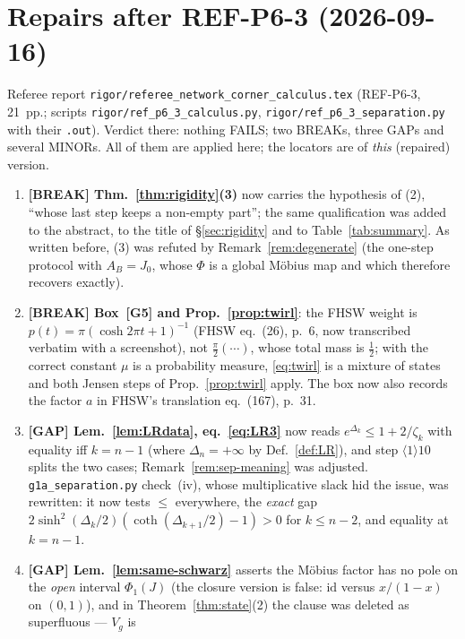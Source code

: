 \documentclass[11pt]{article}
\newcommand{\id}{\mathrm{id}}
\theoremstyle{definition}\newtheorem{example}[theorem]{Example}
\begin{document}
\section{Repairs after REF-P6-3 (2026-09-16)}\label{sec:repairs}

Referee report \texttt{rigor/referee\_network\_corner\_calculus.tex} (REF-P6-3, 21~pp.; scripts
\texttt{rigor/ref\_p6\_3\_calculus.py}, \texttt{rigor/ref\_p6\_3\_separation.py} with their
\texttt{.out}).  Verdict there: nothing FAILS; two BREAKs, three GAPs and several MINORs.  All of
them are applied here; the locators are of \emph{this} (repaired) version.

\begin{enumerate}[leftmargin=2.2em]
\item \textbf{[BREAK] Thm.~\ref{thm:rigidity}(3)} now carries the hypothesis of (2), ``whose last
 step keeps a non-empty part''; the same qualification was added to the abstract, to the title of
 \S\ref{sec:rigidity} and to Table~\ref{tab:summary}.  As written before, (3) was refuted by
 Remark~\ref{rem:degenerate} (the one-step protocol with $A_B=J_0$, whose $\Phi$ is a global
 M\"obius map and which therefore recovers exactly).
\item \textbf{[BREAK] Box~[G5] and Prop.~\ref{prop:twirl}}: the FHSW weight is
 $p(t)=\pi(\cosh2\pi t+1)^{-1}$ (FHSW eq.~(26), p.~6, now transcribed verbatim with a screenshot),
 not $\frac\pi2(\cdots)$, whose total mass is $\frac12$; with the correct constant $\mu$ is a
 probability measure, \eqref{eq:twirl} is a mixture of states and both Jensen steps of
 Prop.~\ref{prop:twirl} apply.  The box now also records the factor $a$ in FHSW's translation
 eq.~(167), p.~31.
\item \textbf{[GAP] Lem.~\ref{lem:LRdata}, eq.~\eqref{eq:LR3}} now reads
 $e^{\Delta_k}\le1+2/\zeta_k$ with equality iff $k=n-1$ (where $\Delta_n=+\infty$ by
 Def.~\ref{def:LR}), and step $\langle1\rangle10$ splits the two cases; Remark~\ref{rem:sep-meaning}
 was adjusted.  \texttt{g1a\_separation.py} check~(iv), whose multiplicative slack hid the issue,
 was rewritten: it now tests $\le$ everywhere, the \emph{exact} gap
 $2\sinh^2(\Delta_k/2)(\coth(\Delta_{k+1}/2)-1)>0$ for $k\le n-2$, and equality at $k=n-1$.
\item \textbf{[GAP] Lem.~\ref{lem:same-schwarz}} asserts the M\"obius factor has no pole on the
 \emph{open} interval $\Phi_1(J)$ (the closure version is false: $\id$ versus $x/(1-x)$ on
 $(0,1)$), and in Theorem~\ref{thm:state}(2) the clause was deleted as superfluous --- $V_g$ is

\end{enumerate}
\end{document}
